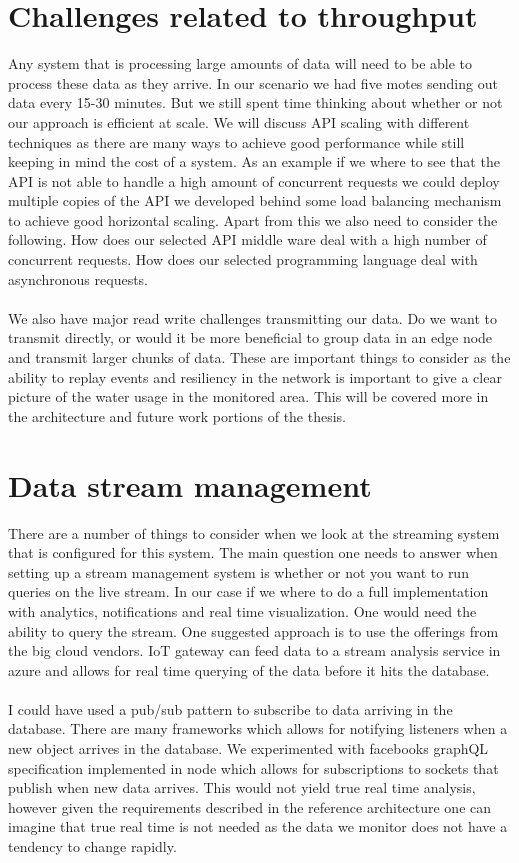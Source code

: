 \documentclass[]{uiophd}
\begin{document}
\section{Challenges related to throughput}

Any system that is processing large amounts of data will need to be able to process these data as they arrive. In our scenario we had five motes sending out data every 15-30 minutes. But we still spent time thinking about whether or not our approach is efficient at scale. We will discuss API scaling with different techniques as there are many ways to achieve good performance while still keeping in mind the cost of a system. As an example if we where to see that the API is not able to handle a high amount of concurrent requests we could deploy multiple copies of the API we developed behind some load balancing mechanism to achieve good horizontal scaling. Apart from this we also need to consider the following. How does our selected API middle ware deal with a high number of concurrent requests. How does our selected programming language deal with asynchronous requests.
\\\\
We also have major read write challenges transmitting our data. Do we want to transmit directly, or would it be more beneficial to group data in an edge node and transmit larger chunks of data. These are important things to consider as the ability to replay events and resiliency in the network is important to give a clear picture of the water usage in the monitored area. This will be covered more in the architecture and future work portions of the thesis.

\section{Data stream management}
There are a number of things to consider when we look at the streaming system that is configured for this system. The main question one needs to answer when setting up a stream management system is whether or not you want to run queries on the live stream. In our case if we where to do a full implementation with analytics, notifications and real time visualization. One would need the ability to query the stream. One suggested approach is to use the offerings from the big cloud vendors. IoT gateway can feed data to a stream analysis service in azure and allows for real time querying of the data before it hits the database.
\\\\
I could have used a pub/sub pattern to subscribe to data arriving in the database. There are many frameworks which allows for notifying listeners when a new object arrives in the database. We experimented with facebooks graphQL specification implemented in node which allows for subscriptions to sockets that publish when new data arrives. This would not yield true real time analysis, however given the requirements described in the reference architecture one can imagine that true real time is not needed as the data we monitor does not have a tendency to change rapidly.
\end{document}
